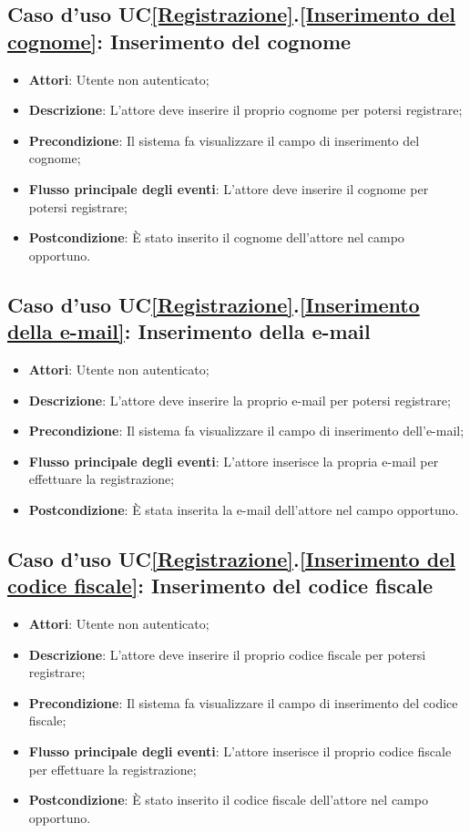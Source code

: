 \subsection{Caso d'uso UC\ref{Registrazione}.\ref{Inserimento del cognome}: Inserimento del cognome}
\begin{itemize}
	\item \textbf{Attori}: Utente non autenticato;
	\item \textbf{Descrizione}: L'attore deve inserire il proprio cognome per potersi registrare;
	\item \textbf{Precondizione}: Il sistema fa visualizzare il campo di inserimento del cognome;
	\item \textbf{Flusso principale degli eventi}: L'attore deve inserire il cognome per potersi registrare;
	\item \textbf{Postcondizione}: È stato inserito il cognome dell'attore nel campo opportuno.
\end{itemize}

\subsection{Caso d'uso UC\ref{Registrazione}.\ref{Inserimento della e-mail}: Inserimento della e-mail}
\begin{itemize}
	\item \textbf{Attori}: Utente non autenticato;
	\item \textbf{Descrizione}: L'attore deve inserire la proprio e-mail per potersi registrare;
	\item \textbf{Precondizione}: Il sistema fa visualizzare il campo di inserimento dell'e-mail;
	\item \textbf{Flusso principale degli eventi}: L'attore inserisce la propria e-mail per effettuare la registrazione;
	\item \textbf{Postcondizione}: È stata inserita la e-mail dell'attore nel campo opportuno.
\end{itemize}

\subsection{Caso d'uso UC\ref{Registrazione}.\ref{Inserimento del codice fiscale}: Inserimento del codice fiscale}
\begin{itemize}
	\item \textbf{Attori}: Utente non autenticato;
	\item \textbf{Descrizione}: L'attore deve inserire il proprio codice fiscale per potersi registrare;
	\item \textbf{Precondizione}: Il sistema fa visualizzare il campo di inserimento del codice fiscale;
	\item \textbf{Flusso principale degli eventi}: L'attore inserisce il proprio codice fiscale per effettuare la registrazione;
	\item \textbf{Postcondizione}: È stato inserito il codice fiscale dell'attore nel campo opportuno.
\end{itemize}

